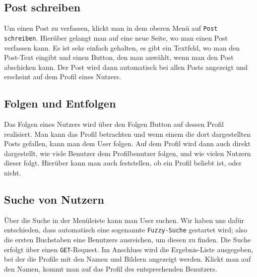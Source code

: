 \subsection{Post schreiben}
Um einen Post zu verfassen, klickt man in dem oberen Menü auf \texttt{Post schreiben}. Hierüber gelangt man auf eine neue Seite, wo man einen Post verfassen kann. Es ist sehr einfach gehalten, es gibt ein Textfeld, wo man den Post-Text eingibt und einen Button, den man anwählt, wenn man den Post abschicken kann. Der Post wird dann automatisch bei allen Posts angezeigt und erscheint auf dem Profil eines Nutzers.

\subsection{Folgen und Entfolgen}
Das Folgen eines Nutzers wird über den Folgen Button auf dessen Profil realisiert. Man kann das Profil betrachten und wenn einem die dort dargestellten Posts gefallen, kann man dem User folgen. Auf dem Profil wird dann auch direkt dargestellt, wie viele Benutzer dem Profilbenutzer folgen, und wie vielen Nutzern dieser folgt. Hierüber kann man auch feststellen, ob ein Profil beliebt ist, oder nicht.

\subsection{Suche von Nutzern}
Über die Suche in der Menüleiste kann man User suchen. Wir haben uns dafür entschieden, dass automatisch eine sogenannte \texttt{Fuzzy-Suche} gestartet wird; also die ersten Buchstaben eine Benutzers ausreichen, um diesen zu finden. Die Suche erfolgt über einen \texttt{GET}-Request. Im Anschluss wird die Ergebnis-Liste ausgegeben, bei der die Profile mit den Namen und Bildern angezeigt werden. Klickt man auf den Namen, kommt man auf das Profil des entsprechenden Benutzers.
